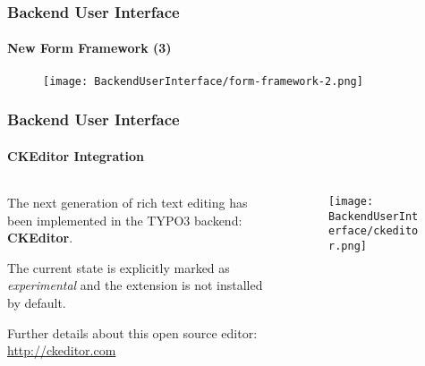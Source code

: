 \begin{frame}[fragile]
	\frametitle{Backend User Interface}
	\framesubtitle{New Form Framework (3)}

	\begin{figure}
		\texttt{[image: BackendUserInterface/form-framework-2.png]}
	\end{figure}

\end{frame}


\begin{frame}[fragile]
	\frametitle{Backend User Interface}
	\framesubtitle{CKEditor Integration}

	\begin{columns}[T]
		\begin{column}{.5\textwidth}
			The next generation of rich text editing has been implemented in the TYPO3 backend:
			\textbf{CKEditor}.\newline

			The current state is explicitly marked as \textit{experimental} and the extension
			is not installed by default.\newline

			Further details about this open source editor: \url{http://ckeditor.com}
		\end{column}
		\begin{column}{.5\textwidth}
			\begin{figure}\vspace*{-0.4cm}
				\texttt{[image: BackendUserInterface/ckeditor.png]}
			\end{figure}
		\end{column}
	\end{columns}

\end{frame}



